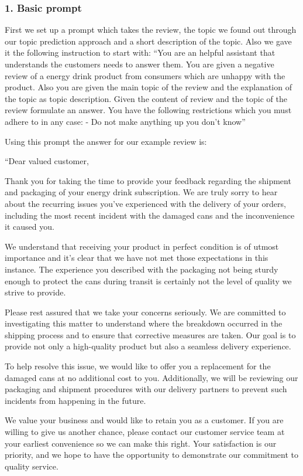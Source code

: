 \documentclass[
]{article}
\begin{document}
\hypertarget{basic-prompt}{%
\subsubsection{1. Basic prompt}\label{basic-prompt}}

First we set up a prompt which takes the review, the topic we found out
through our topic prediction approach and a short description of the
topic. Also we gave it the following instruction to start with: ``You
are an helpful assistant that understands the customers needs to answer
them. You are given a negative review of a energy drink product from
consumers which are unhappy with the product. Also you are given the
main topic of the review and the explanation of the topic as topic
description. Given the content of review and the topic of the review
formulate an answer. You have the following restrictions which you must
adhere to in any case: - Do not make anything up you don't know''

Using this prompt the answer for our example review is:

``Dear valued customer,

Thank you for taking the time to provide your feedback regarding the
shipment and packaging of your energy drink subscription. We are truly
sorry to hear about the recurring issues you've experienced with the
delivery of your orders, including the most recent incident with the
damaged cans and the inconvenience it caused you.

We understand that receiving your product in perfect condition is of
utmost importance and it's clear that we have not met those expectations
in this instance. The experience you described with the packaging not
being sturdy enough to protect the cans during transit is certainly not
the level of quality we strive to provide.

Please rest assured that we take your concerns seriously. We are
committed to investigating this matter to understand where the breakdown
occurred in the shipping process and to ensure that corrective measures
are taken. Our goal is to provide not only a high-quality product but
also a seamless delivery experience.

To help resolve this issue, we would like to offer you a replacement for
the damaged cans at no additional cost to you. Additionally, we will be
reviewing our packaging and shipment procedures with our delivery
partners to prevent such incidents from happening in the future.

We value your business and would like to retain you as a customer. If
you are willing to give us another chance, please contact our customer
service team at your earliest convenience so we can make this right.
Your satisfaction is our priority, and we hope to have the opportunity
to demonstrate our commitment to quality service.
\end{document}
